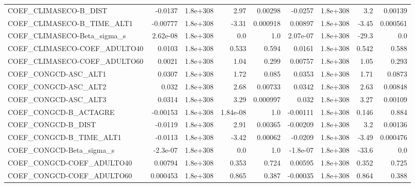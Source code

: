 \begin{tabular}{lrrrrrrrr}
COEF\_CLIMASECO-B\_DIST             &     -0.0137 &     1.8e+308 &      2.97 &  0.00298 &    -0.0257 &    1.8e+308 &          3.2 &       0.00139 \\
COEF\_CLIMASECO-B\_TIME\_ALT1        &    -0.00777 &     1.8e+308 &     -3.31 & 0.000918 &    0.00897 &    1.8e+308 &        -3.45 &      0.000561 \\
COEF\_CLIMASECO-Beta\_sigma\_s       &    2.62e-08 &     1.8e+308 &       0.0 &      1.0 &   2.07e-07 &    1.8e+308 &        -29.3 &           0.0 \\
COEF\_CLIMASECO-COEF\_ADULTO40      &      0.0103 &     1.8e+308 &     0.533 &    0.594 &     0.0161 &    1.8e+308 &        0.542 &         0.588 \\
COEF\_CLIMASECO-COEF\_ADULTO60      &      0.0021 &     1.8e+308 &      1.04 &    0.299 &    0.00757 &    1.8e+308 &         1.05 &         0.293 \\
COEF\_CONGCD-ASC\_ALT1              &      0.0307 &     1.8e+308 &      1.72 &    0.085 &     0.0353 &    1.8e+308 &         1.71 &        0.0873 \\
COEF\_CONGCD-ASC\_ALT2              &       0.032 &     1.8e+308 &      2.68 &  0.00733 &     0.0342 &    1.8e+308 &         2.63 &       0.00848 \\
COEF\_CONGCD-ASC\_ALT3              &      0.0314 &     1.8e+308 &      3.29 & 0.000997 &      0.032 &    1.8e+308 &         3.27 &       0.00109 \\
COEF\_CONGCD-B\_ACTAGRE             &    -0.00153 &     1.8e+308 &  1.84e-08 &      1.0 &   -0.00111 &    1.8e+308 &        0.146 &         0.884 \\
COEF\_CONGCD-B\_DIST                &     -0.0119 &     1.8e+308 &      2.91 &  0.00365 &   -0.00209 &    1.8e+308 &          3.2 &       0.00136 \\
COEF\_CONGCD-B\_TIME\_ALT1           &     -0.0113 &     1.8e+308 &     -3.42 &  0.00062 &    -0.0209 &    1.8e+308 &        -3.49 &      0.000476 \\
COEF\_CONGCD-Beta\_sigma\_s          &    -2.3e-07 &     1.8e+308 &       0.0 &      1.0 &   -1.8e-07 &    1.8e+308 &        -33.6 &           0.0 \\
COEF\_CONGCD-COEF\_ADULTO40         &     0.00794 &     1.8e+308 &     0.353 &    0.724 &    0.00595 &    1.8e+308 &        0.352 &         0.725 \\
COEF\_CONGCD-COEF\_ADULTO60         &    0.000453 &     1.8e+308 &     0.865 &    0.387 &   -0.00035 &    1.8e+308 &        0.864 &         0.388 \\

\end{tabular}
